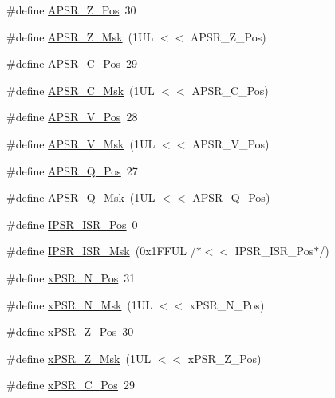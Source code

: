 \begin{DoxyCompactItemize}
\item 
\#define \hyperlink{group__CMSIS__CORE_ga3661286d108b1aca308d7445685eae3a}{A\+P\+S\+R\+\_\+\+Z\+\_\+\+Pos}~30
\item 
\#define \hyperlink{group__CMSIS__CORE_ga1deb4d1aa72bb83d1f79329406f15711}{A\+P\+S\+R\+\_\+\+Z\+\_\+\+Msk}~(1\+U\+L $<$$<$ A\+P\+S\+R\+\_\+\+Z\+\_\+\+Pos)
\item 
\#define \hyperlink{group__CMSIS__CORE_ga6cf72aa6f09a168f9e5beda1a4a887b9}{A\+P\+S\+R\+\_\+\+C\+\_\+\+Pos}~29
\item 
\#define \hyperlink{group__CMSIS__CORE_ga6d47803fbad455bc10bd1ce59f2f335d}{A\+P\+S\+R\+\_\+\+C\+\_\+\+Msk}~(1\+U\+L $<$$<$ A\+P\+S\+R\+\_\+\+C\+\_\+\+Pos)
\item 
\#define \hyperlink{group__CMSIS__CORE_gac62830f67679ccd11658c4172c3e6ea7}{A\+P\+S\+R\+\_\+\+V\+\_\+\+Pos}~28
\item 
\#define \hyperlink{group__CMSIS__CORE_ga33305d6701356bff6890b315fe8b5489}{A\+P\+S\+R\+\_\+\+V\+\_\+\+Msk}~(1\+U\+L $<$$<$ A\+P\+S\+R\+\_\+\+V\+\_\+\+Pos)
\item 
\#define \hyperlink{group__CMSIS__CORE_ga298749e176f12827328bb7b92a6b2411}{A\+P\+S\+R\+\_\+\+Q\+\_\+\+Pos}~27
\item 
\#define \hyperlink{group__CMSIS__CORE_ga90ffd4ec4149c2f5dd7747c1533fb002}{A\+P\+S\+R\+\_\+\+Q\+\_\+\+Msk}~(1\+U\+L $<$$<$ A\+P\+S\+R\+\_\+\+Q\+\_\+\+Pos)
\item 
\#define \hyperlink{group__CMSIS__CORE_ga0e34027584d02c43811ae908a5ca9adf}{I\+P\+S\+R\+\_\+\+I\+S\+R\+\_\+\+Pos}~0
\item 
\#define \hyperlink{group__CMSIS__CORE_gaf013a4579a64d1f21f56ea9f1b33ab56}{I\+P\+S\+R\+\_\+\+I\+S\+R\+\_\+\+Msk}~(0x1\+F\+F\+U\+L /$\ast$$<$$<$ I\+P\+S\+R\+\_\+\+I\+S\+R\+\_\+\+Pos$\ast$/)
\item 
\#define \hyperlink{group__CMSIS__CORE_ga031eb1b8ebcdb3d602d0b9f2ec82a7ae}{x\+P\+S\+R\+\_\+\+N\+\_\+\+Pos}~31
\item 
\#define \hyperlink{group__CMSIS__CORE_gaf600f4ff41b62cf2f3b0a59b6d2e93d6}{x\+P\+S\+R\+\_\+\+N\+\_\+\+Msk}~(1\+U\+L $<$$<$ x\+P\+S\+R\+\_\+\+N\+\_\+\+Pos)
\item 
\#define \hyperlink{group__CMSIS__CORE_ga5869dd608eea73c80f0567d781d2230b}{x\+P\+S\+R\+\_\+\+Z\+\_\+\+Pos}~30
\item 
\#define \hyperlink{group__CMSIS__CORE_ga907599209fba99f579778e662021c4f2}{x\+P\+S\+R\+\_\+\+Z\+\_\+\+Msk}~(1\+U\+L $<$$<$ x\+P\+S\+R\+\_\+\+Z\+\_\+\+Pos)
\item 
\#define \hyperlink{group__CMSIS__CORE_ga14adb79b91f6634b351a1b57394e2db6}{x\+P\+S\+R\+\_\+\+C\+\_\+\+Pos}~29

\end{DoxyCompactItemize}
